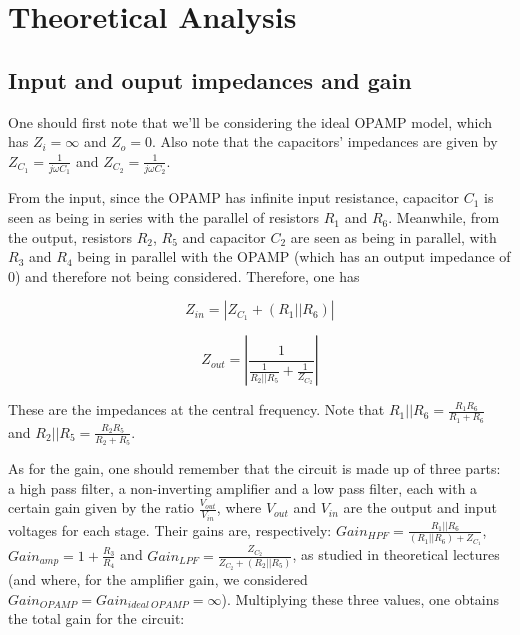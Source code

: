 \section{Theoretical Analysis}
\label{sec:analysis}



\subsection{Input and ouput impedances and gain}

One should first note that we'll be considering the ideal OPAMP model, which has $Z_i = \infty$ and $Z_o = 0$. Also note that the capacitors' impedances are given by $Z_{C_1} = \frac{1}{j \omega C_1}$ and $Z_{C_2} = \frac{1}{j \omega C_2}$. 



From the input, since the OPAMP has infinite input resistance, capacitor $C_1$ is seen as being in series with the parallel of resistors $R_1$ and $R_6$. Meanwhile, from the output, resistors $R_2$, $R_5$ and capacitor $C_2$ are seen as being in parallel, with $R_3$ and $R_4$ being in parallel with the OPAMP (which has an output impedance of $0$) and therefore not being considered. Therefore, one has

\begin{equation}
Z_{in} = |Z_{C_1} + (R_1||R_6)|
\end{equation}

\begin{equation}
Z_{out} = \left|\frac{1}{\frac{1}{R_2 || R_5} + \frac{1}{Z_{C_2}}}\right|
\end{equation}

These are the impedances at the central frequency. Note that $R_1||R_6 = \frac{R_1 R_6}{R_1 + R_6}$ and $R_2||R_5 = \frac{R_2 R_5}{R_2 + R_5}$.




As for the gain, one should remember that the circuit is made up of three parts: a high pass filter, a non-inverting amplifier and a low pass filter, each with a certain gain given by the ratio $\frac{V_{out}}{V_{in}}$, where $V_{out}$ and $V_{in}$ are the output and input voltages for each stage. Their gains are, respectively: $Gain_{HPF} = \frac{R_1||R_6}{(R_1||R_6) + Z_{C_1}}$, $Gain_{amp} = 1+\frac{R_3}{R_4}$ and $Gain_{LPF} = \frac{Z_{C_2}}{Z_{C_2}+(R_2||R_5)}$, as studied in theoretical lectures (and where, for the amplifier gain, we considered $Gain_{OPAMP} = Gain_{ideal \ OPAMP} = \infty$). Multiplying these three values, one obtains the total gain for the circuit:

